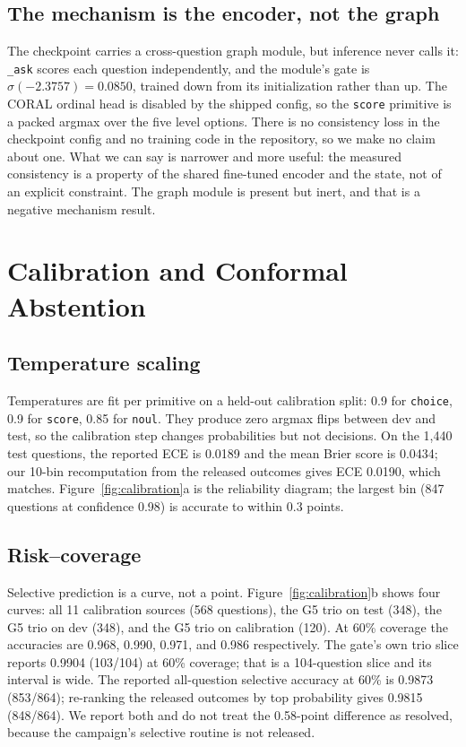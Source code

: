 \documentclass[11pt]{article}
\begin{document}
\subsection{The mechanism is the encoder, not the graph}
The checkpoint carries a cross-question graph module, but inference never calls it: \texttt{\_ask} scores each question independently, and the module's gate is $\sigma(-2.3757)=0.0850$, trained down from its initialization rather than up. The CORAL ordinal head is disabled by the shipped config, so the \texttt{score} primitive is a packed argmax over the five level options. There is no consistency loss in the checkpoint config and no training code in the repository, so we make no claim about one. What we can say is narrower and more useful: the measured consistency is a property of the shared fine-tuned encoder and the state, not of an explicit constraint. The graph module is present but inert, and that is a negative mechanism result.

\section{Calibration and Conformal Abstention}
\label{sec:calibration}

\subsection{Temperature scaling}
Temperatures are fit per primitive on a held-out calibration split: 0.9 for \texttt{choice}, 0.9 for \texttt{score}, 0.85 for \texttt{noul}. They produce zero argmax flips between dev and test, so the calibration step changes probabilities but not decisions. On the 1{,}440 test questions, the reported ECE is 0.0189 and the mean Brier score is 0.0434; our 10-bin recomputation from the released outcomes gives ECE 0.0190, which matches. Figure~\ref{fig:calibration}a is the reliability diagram; the largest bin (847 questions at confidence 0.98) is accurate to within 0.3 points.

\subsection{Risk--coverage}
Selective prediction is a curve, not a point. Figure~\ref{fig:calibration}b shows four curves: all 11 calibration sources (568 questions), the G5 trio on test (348), the G5 trio on dev (348), and the G5 trio on calibration (120). At 60\% coverage the accuracies are 0.968, 0.990, 0.971, and 0.986 respectively. The gate's own trio slice reports 0.9904 (103/104) at 60\% coverage; that is a 104-question slice and its interval is wide. The reported all-question selective accuracy at 60\% is 0.9873 (853/864); re-ranking the released outcomes by top probability gives 0.9815 (848/864). We report both and do not treat the 0.58-point difference as resolved, because the campaign's selective routine is not released.
\end{document}
